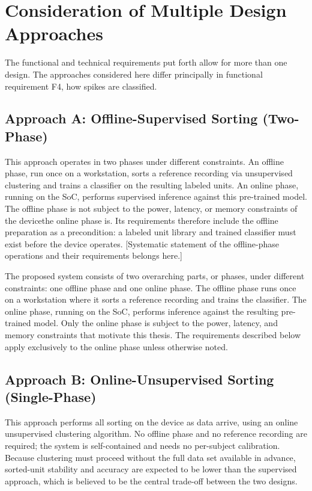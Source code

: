 \section*{Consideration of Multiple Design Approaches}

The functional and technical requirements put forth allow for more than one design. The
approaches considered here differ principally in functional requirement F4, how spikes are
classified.

\subsection*{Approach A: Offline-Supervised Sorting (Two-Phase)}
This approach operates in two phases under different constraints. An offline phase,
run once on a workstation, sorts a reference recording via unsupervised clustering and
trains a classifier on the resulting labeled units. An online phase, running on the
SoC, performs supervised inference against this pre-trained model. The offline phase
is not subject to the power, latency, or memory constraints of the devicethe online
phase is. Its requirements therefore include the offline preparation as a
precondition: a labeled unit library and trained classifier must exist before the
device operates. [Systematic statement of the offline-phase operations and their
requirements belongs here.]

The proposed system consists of two overarching parts, or phases, under different 
constraints: one offline phase and one online phase. The offline phase runs once 
on a workstation where it sorts a reference recording and trains the classifier. The 
online phase, running on the SoC, performs inference against the resulting pre-trained 
model. Only the online phase is subject to the power, latency, and memory constraints that
motivate this thesis. The requirements described below apply exclusively to the
online phase unless otherwise noted.

\subsection*{Approach B: Online-Unsupervised Sorting (Single-Phase)}
This approach performs all sorting on the device as data arrive, using an online
unsupervised clustering algorithm. No offline phase and no reference recording are
required; the system is self-contained and needs no per-subject calibration. Because
clustering must proceed without the full data set available in advance, sorted-unit
stability and accuracy are expected to be lower than the supervised approach, which
is believed to be the central trade-off between the two designs.

